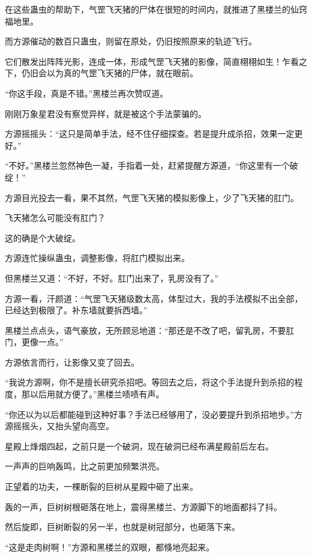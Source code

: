 \begin{this_body}
在这些蛊虫的帮助下，气罡飞天猪的尸体在很短的时间内，就推进了黑楼兰的仙窍福地里。

而方源催动的数百只蛊虫，则留在原处，仍旧按照原来的轨迹飞行。

它们散发出阵阵光影，连成一体，形成气罡飞天猪的影像，简直栩栩如生！乍看之下，仍旧会以为真的气罡飞天猪的尸体，就在眼前。

“你这手段，真是不错。”黑楼兰再次赞叹道。

刚刚万象星君没有察觉异样，就是被这个手法蒙骗的。

方源摇摇头：“这只是简单手法，经不住仔细探查。若是提升成杀招，效果一定更好。”

“不好。”黑楼兰忽然神色一凝，手指着一处，赶紧提醒方源道，“你这里有一个破绽！”

方源目光投去一看，果不其然，气罡飞天猪的模拟影像上，少了飞天猪的肛门。

飞天猪怎么可能没有肛门？

这的确是个大破绽。

方源连忙操纵蛊虫，调整影像，将肛门模拟出来。

但黑楼兰又道：“不好，不好。肛门出来了，乳房没有了。”

方源一看，汗颜道：“气罡飞天猪级数太高，体型过大，我的手法模拟不出全部，已经达到极限了。补东墙就要拆西墙。”

黑楼兰点点头，语气豪放，无所顾忌地道：“那还是不改了吧，留乳房，不要肛门，更像一点。”

方源依言而行，让影像又变了回去。

“我说方源啊，你不是擅长研究杀招吧。等回去之后，将这个手法提升到杀招的程度，那以后用就方便了。”黑楼兰啧啧有声。

“你还以为以后都能碰到这种好事？手法已经够用了，没必要提升到杀招地步。”方源摇摇头，又抬头望向高空。

星殿上烽烟四起，之前只是一个破洞，现在破洞已经布满星殿前后左右。

一声声的巨响轰鸣，比之前更加频繁洪亮。

正望着的功夫，一棵断裂的巨树从星殿中砸了出来。

轰的一声，巨树树根砸落在地上，震得黑楼兰、方源脚下的地面都抖了抖。

然后旋即，巨树断裂的另一半，也就是树冠部分，也砸落下来。

“这是走肉树啊！”方源和黑楼兰的双眼，都倏地亮起来。

\end{this_body}

